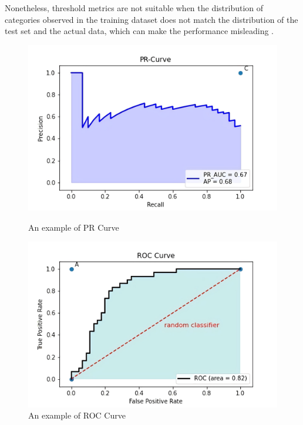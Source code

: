 Nonetheless, threshold metrics are not suitable when the distribution of categories observed in the training dataset does not match the distribution of the test set and the actual data, which can make the performance misleading \cite{51}. 
\begin{figure}[h]
    \centering
    \begin{minipage}{0.49\textwidth}
        \includegraphics[width=\textwidth]{images/fig5}
        \caption{An example of PR Curve}
        \label{fig5}
    \end{minipage}
    \begin{minipage}{0.49\textwidth}
        \includegraphics[width=\textwidth]{images/fig6}
        \caption{An example of ROC Curve}
        \label{fig6}
    \end{minipage}
\end{figure}

